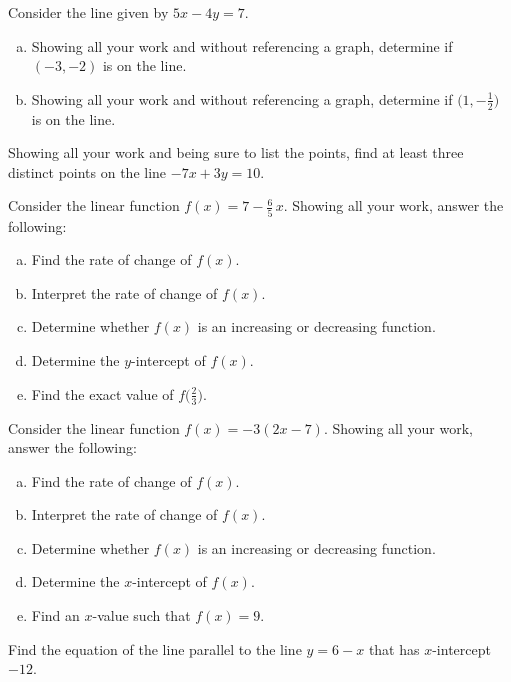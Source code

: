 \documentclass[12pt,letterpaper]{exam}
\begin{document}
\begin{questions}
\newpage
\question[10] Consider the line given by $5x - 4y= 7$.
	\begin{enumerate}[(a)]
	\item Showing all your work and without referencing a graph, determine if $(-3, -2)$ is on the line. 
	\item Showing all your work and without referencing a graph, determine if $\big(1, -\frac{1}{2} \big)$ is on the line. 
	\end{enumerate}



\newpage
\question[10] Showing all your work and being sure to list the points, find at least three distinct points on the line $-7x + 3y= 10$. 



\newpage
\question[10] Consider the linear function $f(x)= 7 - \frac{6}{5}\,x$. Showing all your work, answer the following:
	\begin{enumerate}[(a)]
	\item Find the rate of change of $f(x)$.
	\item Interpret the rate of change of $f(x)$. 
	\item Determine whether $f(x)$ is an increasing or decreasing function.
	\item Determine the $y$-intercept of $f(x)$.
	\item Find the exact value of $f \big( \frac{2}{3} \big)$. 
	\end{enumerate}



\newpage
\question[10] Consider the linear function $f(x)= -3(2x - 7)$. Showing all your work, answer the following:
	\begin{enumerate}[(a)]
	\item Find the rate of change of $f(x)$.
	\item Interpret the rate of change of $f(x)$. 
	\item Determine whether $f(x)$ is an increasing or decreasing function.
	\item Determine the $x$-intercept of $f(x)$.
	\item Find an $x$-value such that $f(x)= 9$.
	\end{enumerate}



\newpage
\question[10] Find the equation of the line parallel to the line $y= 6 - x$ that has $x$-intercept $-12$. 




\end{questions}
\end{document}
